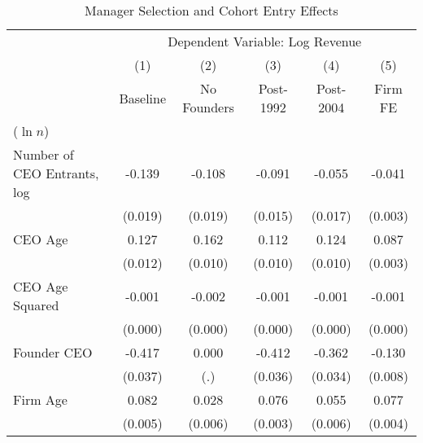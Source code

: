 \begin{table}[htbp]\centering
\caption{Manager Selection and Cohort Entry Effects}\label{tab:cohort\_selection}
\begin{threeparttable}
\begin{tabular}{lccccc}
\toprule
            &\multicolumn{5}{c}{Dependent Variable: Log Revenue}                                                          \\\cmidrule(lr){2-6}
            &\multicolumn{1}{c}{(1)}&\multicolumn{1}{c}{(2)}&\multicolumn{1}{c}{(3)}&\multicolumn{1}{c}{(4)}&\multicolumn{1}{c}{(5)}\\
            &\multicolumn{1}{c}{Baseline}&\multicolumn{1}{c}{No Founders}&\multicolumn{1}{c}{Post-1992}&\multicolumn{1}{c}{Post-2004}&\multicolumn{1}{c}{Firm FE}\\
\midrule
($\ln n$)   &                     &                     &                     &                     &                     \\
\addlinespace
Number of CEO Entrants, log&      -0.139\sym{***}&      -0.108\sym{***}&      -0.091\sym{***}&      -0.055\sym{***}&      -0.041\sym{***}\\
            &     (0.019)         &     (0.019)         &     (0.015)         &     (0.017)         &     (0.003)         \\
\addlinespace
CEO Age     &       0.127\sym{***}&       0.162\sym{***}&       0.112\sym{***}&       0.124\sym{***}&       0.087\sym{***}\\
            &     (0.012)         &     (0.010)         &     (0.010)         &     (0.010)         &     (0.003)         \\
\addlinespace
CEO Age Squared&      -0.001\sym{***}&      -0.002\sym{***}&      -0.001\sym{***}&      -0.001\sym{***}&      -0.001\sym{***}\\
            &     (0.000)         &     (0.000)         &     (0.000)         &     (0.000)         &     (0.000)         \\
\addlinespace
Founder CEO &      -0.417\sym{***}&       0.000         &      -0.412\sym{***}&      -0.362\sym{***}&      -0.130\sym{***}\\
            &     (0.037)         &         (.)         &     (0.036)         &     (0.034)         &     (0.008)         \\
\addlinespace
Firm Age    &       0.082\sym{***}&       0.028\sym{***}&       0.076\sym{***}&       0.055\sym{***}&       0.077\sym{***}\\
            &     (0.005)         &     (0.006)         &     (0.003)         &     (0.006)         &     (0.004)         \\

\end{tabular}
\end{threeparttable}
\end{table}
